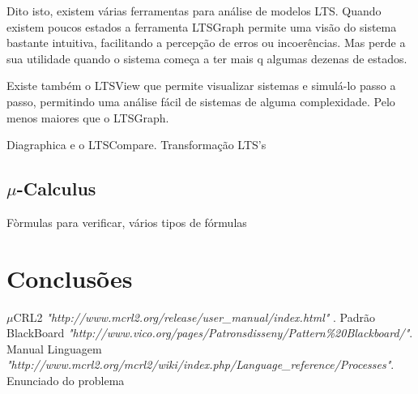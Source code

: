 \documentclass[a4paper,11pt]{article}
\newcommand{\mc}{$\mu$CRL2}
\begin{document}
Dito isto, existem várias ferramentas para análise de modelos LTS.
Quando existem poucos estados a ferramenta LTSGraph permite uma visão do sistema
bastante intuitiva, facilitando a percepção de erros ou incoerências. Mas perde a sua utilidade quando o sistema
começa a ter mais q algumas dezenas de estados. \par 

Existe também o LTSView que permite visualizar sistemas e simulá-lo passo a passo, permitindo uma análise
fácil de sistemas de alguma complexidade. Pelo menos maiores que o LTSGraph.

Diagraphica e o LTSCompare. Transformação LTS's

\subsection{$\mu$-Calculus}

Fòrmulas para verificar, vários tipos de fórmulas 

\section{Conclusões}


\begin{thebibliography}{4}

 \mc{} \emph { "http://www.mcrl2.org/release/user\_manual/index.html" }.
 Padrão BlackBoard \emph { "http://www.vico.org/pages/Patronsdisseny/Pattern\%20Blackboard/"}.
 Manual Linguagem \\ \emph{"http://www.mcrl2.org/mcrl2/wiki/index.php/Language\_reference/Processes"}.
 Enunciado do problema
\end{thebibliography}
\end{document}
